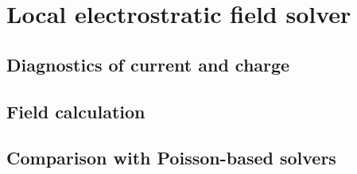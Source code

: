 \chapter{Local electrostratic field solver}

  \section{Diagnostics of current and charge}
  
  \section{Field calculation}

  \section{Comparison with Poisson-based solvers}
